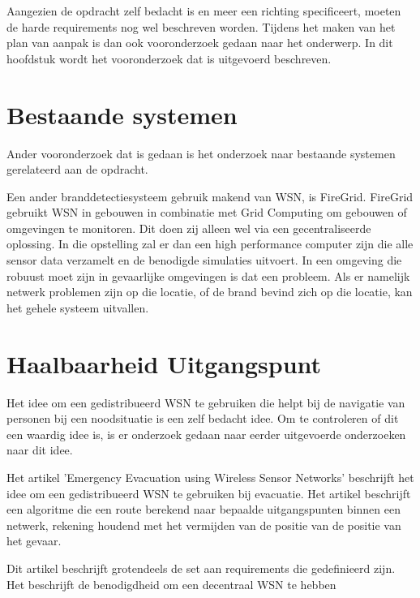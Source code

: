 
Aangezien de opdracht zelf bedacht is en meer een richting specificeert, moeten de harde requirements nog wel beschreven worden. Tijdens het maken van het plan van aanpak is dan ook vooronderzoek gedaan naar het onderwerp. In dit hoofdstuk wordt het vooronderzoek dat is uitgevoerd beschreven.

\section{Bestaande systemen}
Ander vooronderzoek dat is gedaan is het onderzoek naar bestaande systemen gerelateerd aan de opdracht. 

Een ander branddetectiesysteem gebruik makend van WSN, is FireGrid\cite{FireGrid}. FireGrid gebruikt WSN in gebouwen in combinatie met Grid Computing om gebouwen of omgevingen te monitoren. Dit doen zij alleen wel via een gecentraliseerde oplossing. In die opstelling zal er dan een high performance computer zijn die alle sensor data verzamelt en de benodigde simulaties uitvoert. In een omgeving die robuust moet zijn in gevaarlijke omgevingen is dat een probleem. Als er namelijk netwerk problemen zijn op die locatie, of de brand bevind zich op die locatie, kan het gehele systeem uitvallen. 


\section{Haalbaarheid Uitgangspunt}
Het idee om een gedistribueerd WSN te gebruiken die helpt bij de navigatie van personen bij een noodsituatie is een zelf bedacht idee. Om te controleren of dit een waardig idee is, is er onderzoek gedaan naar eerder uitgevoerde onderzoeken naar dit idee.

Het artikel 'Emergency Evacuation using Wireless Sensor Networks'\cite{BarnesEmEv} beschrijft het idee om een gedistribueerd WSN te gebruiken bij evacuatie. Het artikel beschrijft een algoritme die een route berekend naar bepaalde uitgangspunten binnen een netwerk, rekening houdend met het vermijden van de positie van de positie van het gevaar.

Dit artikel beschrijft grotendeels de set aan requirements die gedefinieerd zijn. Het beschrijft de benodigdheid om een decentraal WSN te hebben

